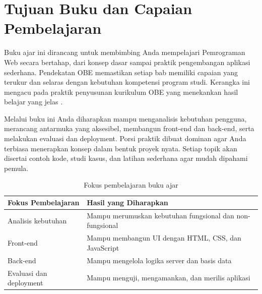 \section{Tujuan Buku dan Capaian Pembelajaran}
Buku ajar ini dirancang untuk membimbing Anda mempelajari Pemrograman Web secara bertahap, dari konsep dasar sampai praktik pengembangan aplikasi sederhana. Pendekatan OBE memastikan setiap bab memiliki capaian yang terukur dan selaras dengan kebutuhan kompetensi program studi. Kerangka ini mengacu pada praktik penyusunan kurikulum OBE yang menekankan hasil belajar yang jelas \cite{aptikomObe}.

Melalui buku ini Anda diharapkan mampu menganalisis kebutuhan pengguna, merancang antarmuka yang aksesibel, membangun front-end dan back-end, serta melakukan evaluasi dan deployment. Porsi praktik dibuat dominan agar Anda terbiasa menerapkan konsep dalam bentuk proyek nyata. Setiap topik akan disertai contoh kode, studi kasus, dan latihan sederhana agar mudah dipahami pemula.

\begin{table}[htbp]
\centering
\begin{tabular}{|P{4cm}|P{8cm}|}
\hline
\textbf{Fokus Pembelajaran} & \textbf{Hasil yang Diharapkan} \\
\hline
Analisis kebutuhan & Mampu merumuskan kebutuhan fungsional dan non-fungsional \\
\hline
Front-end & Mampu membangun UI dengan HTML, CSS, dan JavaScript \\
\hline
Back-end & Mampu mengelola logika server dan basis data \\
\hline
Evaluasi dan deployment & Mampu menguji, mengamankan, dan merilis aplikasi \\
\hline
\end{tabular}
\caption{Fokus pembelajaran buku ajar}
\end{table}


